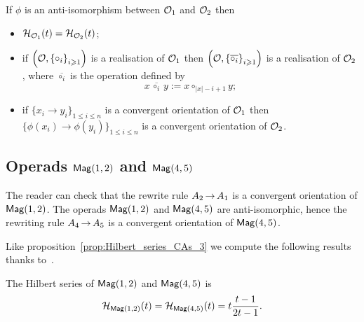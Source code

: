 \begin{Proposition} \label{prop:Recall_anti_isomorphic}
    If $\phi$ is an anti-isomorphism between $\mathcal{O}_1$ and $\mathcal{O}_2$ then
    \begin{itemize}
        \item $\mathcal{H}_{\mathcal{O}_1}(t) = \mathcal{H}_{\mathcal{O}_2}(t)$;
        \item if $\left(\mathcal{O}, \left\{\circ_i\right\}_{i \geqslant 1}\right)$
         is a realisation of $\mathcal{O}_1$ then
         \begin{math}
        \left(\mathcal{O}, \left\{\overline{\circ_i}\right\}_{i \geqslant 1}\right)
        \end{math} is a
    realisation of $\mathcal{O}_2$, where $\overline{\circ_i}$ is the operation
    defined by
    \begin{equation}
    x \, \overline{\circ_i} \, y := x \circ_{|x|-i+1} y;
    \end{equation}
    \item if $\{ x_i \rightarrow y_i \}_{1 \leq i \leq n}$ is a convergent
     orientation of $\mathcal{O}_1$ then $\{ \phi\left(x_i\right) \rightarrow
     \phi\left(y_i\right) \}_{1 \leq i \leq n}$ is a convergent orientation
      of $\mathcal{O}_2$. 

    \end{itemize}
\end{Proposition}


\subsection{Operads \texorpdfstring{$\mathsf{Mag}(1,2)$}{Mag(1,2)} and
\texorpdfstring{$\mathsf{Mag}(4,5)$}{Mag(4,5)}} \label{sub:Mag_1_2}
The reader can check that the rewrite rule $A_2 \operatorname{\to} A_1$ is a
convergent orientation of $\mathsf{Mag}(1,2)$. The operads $\mathsf{Mag}(1,2)$ and
$\mathsf{Mag}(4,5)$ are anti-isomorphic, hence the rewriting rule $A_4 \operatorname{\to} A_5$
is a convergent orientation of $\mathsf{Mag}(4,5)$.

Like proposition~\eqref{prop:Hilbert_series_CAs_3} we compute the
following results thanks to~\cite{Gir18}.
\begin{Proposition} \label{prop:Hilbert_series_Mag_1_2}
The Hilbert series of $\mathsf{Mag}(1,2)$ and $\mathsf{Mag}(4,5)$ is
\begin{equation} \label{equ:Hilbert_series_Mag_1_2}
\mathcal{H}_{\mathsf{Mag}(1,2)}(t) = \mathcal{H}_{\mathsf{Mag}(4,5)}(t) =
t\frac{t-1}{2t -1}.
\end{equation}
\end{Proposition}

